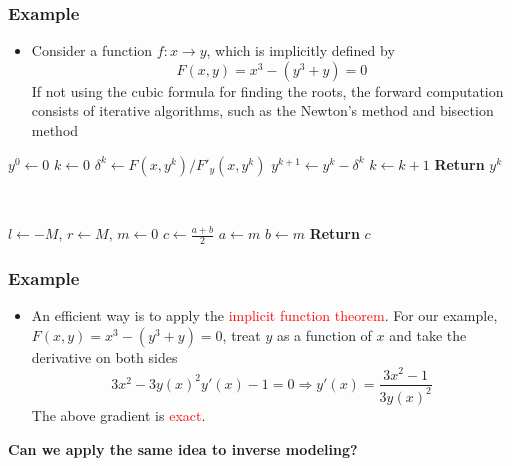 \documentclass[usenames,dvipsnames]{beamer}
\begin{document}
\begin{frame}
	\frametitle{Example}
	
\begin{itemize}
	\item Consider a function $f:x\rightarrow y$, which is implicitly defined by 
	$$F(x,y) = x^3 - (y^3+y) = 0$$
If not using the cubic formula for finding the roots, the forward computation consists of iterative algorithms, such as the Newton's method and bisection method
\end{itemize}



\begin{minipage}[t]{0.48\textwidth}
\centering
\begin{algorithmic}
\State $y^0 \gets 0$
\State $k \gets 0$
\State $\delta^k \gets F(x, y^k)/F'_y(x,y^k)$
\State $y^{k+1}\gets y^k - \delta^k$
\State $k \gets k+1$
\EndWhile
\State \textbf{Return} $y^k$
\end{algorithmic}
\end{minipage}~
\begin{minipage}[t]{0.48\textwidth}
\centering
\begin{algorithmic}
\State $l \gets -M$, $r\gets M$, $m\gets 0$
\State $c \gets \frac{a+b}{2}$
\State $a\gets m$
\Else
\State $b\gets m$
\EndIf
\EndWhile
\State \textbf{Return} $c$
\end{algorithmic}

\end{minipage}	

\end{frame}


\begin{frame}
	\frametitle{Example}
	
	\begin{itemize}
		\item An efficient way is to apply the \textcolor{red}{implicit function theorem}. For our example, $F(x,y)=x^3-(y^3+y)=0$, treat $y$ as a function of $x$ and take the derivative on both sides
		$$3x^2 - 3y(x)^2y'(x)-1=0\Rightarrow y'(x) = \frac{3x^2-1}{3y(x)^2}$$
	The above gradient is \textcolor{red}{exact}.
	\end{itemize}
	\begin{center}
			\textbf{Can we apply the same idea to inverse modeling?}
	\end{center}

\end{frame}
\end{document}
